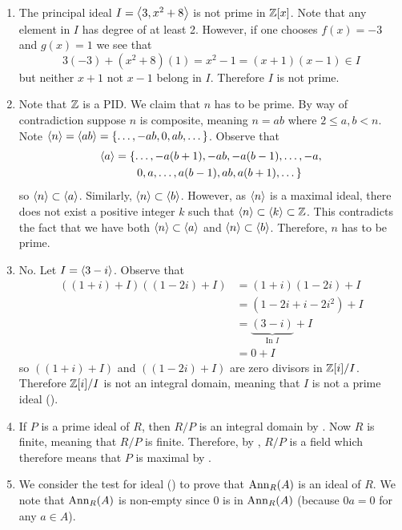 \begin{enumerate}
    \item The principal ideal $I = \left\langle3, x^2+8\right\rangle$ is not prime in $\mathbb{Z}[x]$. Note that any element in $I$ has degree of at least 2. However, if one chooses $f(x) = -3$ and $g(x) = 1$ we see that
    \[
        3(-3) + (x^2+8)(1) = x^2 - 1 = (x+1)(x-1) \in I
    \]
    but neither $x+1$ not $x-1$ belong in $I$. Therefore $I$ is not prime.

    \item Note that $\mathbb{Z}$ is a PID. We claim that $n$ has to be prime. By way of contradiction suppose $n$ is composite, meaning $n = ab$ where $2 \leq a,b < n$. Note $\left\langle n\right\rangle = \left\langle ab\right\rangle = \{\dots, -ab, 0, ab, \dots\}$. Observe that
    \begin{align*}
        \left\langle a\right\rangle &= \{\dots, -a(b+1), -ab, -a(b-1), \dots, -a,\\
        &\quad\quad0, a, \dots, a(b-1), ab, a(b+1), \dots\}
    \end{align*}
    so $\left\langle n\right\rangle \subset \left\langle a\right\rangle$. Similarly, $\left\langle n\right\rangle \subset \left\langle b\right\rangle$. However, as $\left\langle n\right\rangle$ is a maximal ideal, there does not exist a positive integer $k$ such that $\left\langle n\right\rangle \subset \left\langle k\right\rangle \subset \mathbb{Z}$. This contradicts the fact that we have both $\left\langle n\right\rangle \subset \left\langle a\right\rangle$ and $\left\langle n\right\rangle \subset \left\langle b\right\rangle$. Therefore, $n$ has to be prime.

    \item No. Let $I = \left\langle3-i\right\rangle$. Observe that
    \begin{align*}
        ((1+i)+I)((1-2i)+I) &= (1+i)(1-2i) + I\\
        &= (1-2i+i-2i^2) + I\\
        &= \underbrace{(3 - i)}_{\text{In }I} + I\\
        &= 0 + I
    \end{align*}
    so $((1+i)+I)$ and $((1-2i)+I)$ are zero divisors in $\mathbb{Z}[i]/I$. Therefore $\mathbb{Z}[i]/I$ is not an integral domain, meaning that $I$ is not a prime ideal ().

    \item If $P$ is a prime ideal of $R$, then $R/P$ is an integral domain by . Now $R$ is finite, meaning that $R/P$ is finite. Therefore, by , $R/P$ is a field which therefore means that $P$ is maximal by .
    
    \item We consider the test for ideal () to prove that $\mathrm{Ann}_{R}(A)$ is an ideal of $R$. We note that $\mathrm{Ann}_{R}(A)$ is non-empty since 0 is in $\mathrm{Ann}_{R}(A)$ (because $0a = 0$ for any $a \in A$).


\end{enumerate}
